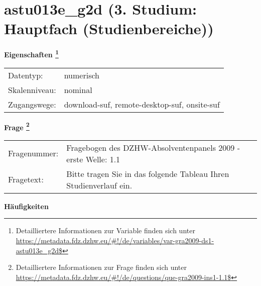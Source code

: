 
    \setcounter{footnote}{0}

    \vspace*{-1.8cm}
	\section{astu013e\_g2d (3. Studium: Hauptfach (Studienbereiche))}
	\label{section:astu013e_g2d}



    \vspace*{0.5cm}
    \noindent\textbf{Eigenschaften
	\footnote{Detailliertere Informationen zur Variable finden sich unter
		\url{https://metadata.fdz.dzhw.eu/\#!/de/variables/var-gra2009-ds1-astu013e_g2d$}}}\\
	\begin{tabularx}{\hsize}{@{}lX}
	Datentyp: & numerisch \\
	Skalenniveau: & nominal \\
	Zugangswege: &
	  download-suf, 
	  remote-desktop-suf, 
	  onsite-suf
 \\
    \end{tabularx}



				\vspace*{0.5cm}
                \noindent\textbf{Frage
	                \footnote{Detailliertere Informationen zur Frage finden sich unter
		              \url{https://metadata.fdz.dzhw.eu/\#!/de/questions/que-gra2009-ins1-1.1$}}}\\
				\begin{tabularx}{\hsize}{@{}lX}
					Fragenummer: &
					  Fragebogen des DZHW-Absolventenpanels 2009 - erste Welle:
					  1.1
 \\
					Fragetext: & Bitte tragen Sie in das folgende Tableau Ihren Studienverlauf ein. \\
				\end{tabularx}





        		\vspace*{0.5cm}
                \noindent\textbf{Häufigkeiten}


